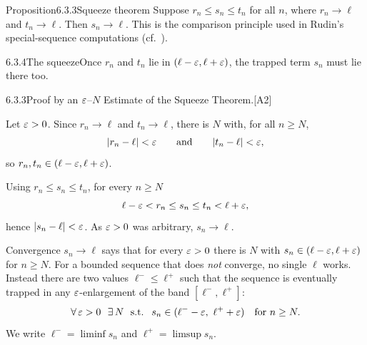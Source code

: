 \documentclass[main.tex]{subfiles}
\begin{document}
\begin{Obj}{Proposition}{6.3.3}{Squeeze theorem}
Suppose $r_n\le s_n\le t_n$ for all $n$, where $r_n\to\ell$ and $t_n\to\ell$. Then $s_n\to\ell$.
This is the comparison principle used in Rudin's special-sequence computations (cf.\ ).
\end{Obj}

\begin{Fig}{6.3.4}{The squeeze}{Once $r_n$ and $t_n$ lie in $(\ell-\varepsilon,\ell+\varepsilon)$, the trapped term $s_n$ must lie there too.}
\end{Fig}

\begin{Prf}{6.3.3}{Proof by an $\varepsilon$--$N$ Estimate of the Squeeze Theorem.}{[A2]}
\item Let $\varepsilon>0$. Since $r_n\to\ell$ and $t_n\to\ell$, there is $N$ with, for all $n\ge N$,
  \[ |r_n-\ell|<\varepsilon \qquad\text{and}\qquad |t_n-\ell|<\varepsilon , \]
  so $r_n,t_n\in(\ell-\varepsilon,\ell+\varepsilon)$.
\item Using $r_n\le s_n\le t_n$, for every $n\ge N$
  \[ \ell-\varepsilon < r_n \le s_n \le t_n < \ell+\varepsilon , \]
  hence $|s_n-\ell|<\varepsilon$. As $\varepsilon>0$ was arbitrary, $s_n\to\ell$.
\end{Prf}


\noindent Convergence $s_n\to\ell$ says that for every $\varepsilon>0$ there is $N$ with
$s_n\in(\ell-\varepsilon,\ell+\varepsilon)$ for $n\ge N$. For a bounded sequence that does \emph{not}
converge, no single $\ell$ works. Instead there are two values $\ell^-\le\ell^+$ such that the
sequence is eventually trapped in any $\varepsilon$-enlargement of the band $[\ell^-,\ell^+]$:
\[ \forall\,\varepsilon>0\ \ \exists\,N\ \text{ s.t. }\ s_n\in(\ell^--\varepsilon,\ \ell^++\varepsilon)\quad\text{for }n\ge N . \]
We write $\ell^-=\liminf s_n$ and $\ell^+=\limsup s_n$.
\end{document}
